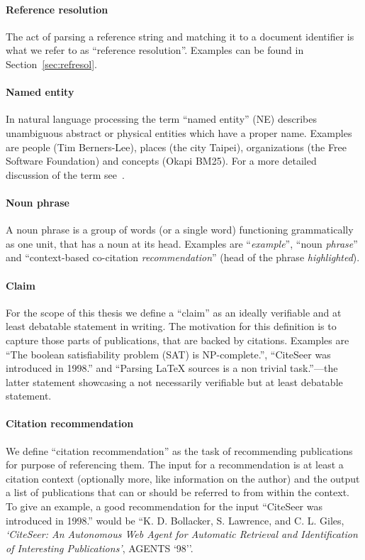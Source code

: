 \paragraph{Reference resolution} The act of parsing a reference string and matching it to a document identifier is what we refer to as ``reference resolution''. Examples can be found in Section~\ref{sec:refresol}.
\paragraph{Named entity} In natural language processing the term ``named entity'' (NE) describes unambiguous abstract or physical entities which have a proper name. Examples are people (Tim Berners-Lee), places (the city Taipei), organizations (the Free Software Foundation) and concepts (Okapi BM25). For a more detailed discussion of the term see~\cite{Nadeau2007}.
\paragraph{Noun phrase} A noun phrase is a group of words (or a single word) functioning grammatically as one unit, that has a noun at its head. Examples are ``\emph{example}'', ``noun \emph{phrase}'' and ``context-based co-citation \emph{recommendation}'' (head of the phrase \emph{highlighted}).
\paragraph{Claim} For the scope of this thesis we define a ``claim'' as an ideally verifiable and at least debatable statement in writing. The motivation for this definition is to capture those parts of publications, that are backed by citations. Examples are ``The boolean satisfiability problem (SAT) is NP-complete.'', ``CiteSeer was introduced in 1998.'' and ``Parsing \LaTeX{} sources is a non trivial task.''---the latter statement showcasing a not necessarily verifiable but at least debatable statement.
\paragraph{Citation recommendation} We define ``citation recommendation'' as the task of recommending publications for purpose of referencing them. The input for a recommendation is at least a citation context (optionally more, like information on the author) and the output a list of publications that can or should be referred to from within the context. To give an example, a good recommendation for the input ``CiteSeer was introduced in 1998.'' would be ``K. D. Bollacker, S. Lawrence, and C. L. Giles, \emph{`CiteSeer: An Autonomous Web Agent for Automatic Retrieval and Identification of Interesting Publications'}, AGENTS `98''.

